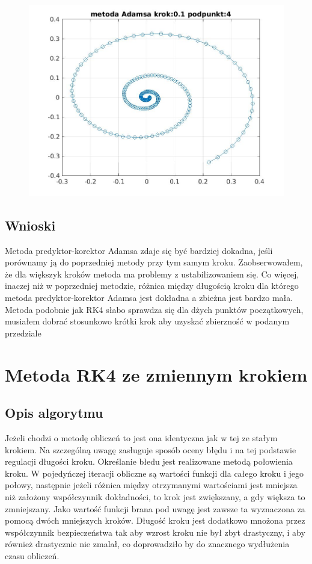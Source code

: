\documentclass[a4paper, 12pt]{article}
\begin{document}
\begin{figure}[H]
\centering
\includegraphics[width = 15cm]{2d/metoda Adamsa krok:0,1 podpunkt:4.jpg}
\end{figure}

\subsection{Wnioski}
Metoda predyktor-korektor Adamsa zdaje się być bardziej dokadna, jeśli porównamy ją do poprzedniej metody przy tym samym kroku. Zaobserwowałem, że dla większyk kroków metoda ma problemy z ustabilizowaniem się. Co więcej, inaczej niż w poprzedniej metodzie, różnica między długością kroku dla którego metoda predyktor-korektor Adamsa jest dokładna a zbieżna jest bardzo mała. Metoda podobnie jak RK4 słabo sprawdza się dla dżych punktów początkowych, musiałem dobrać stosunkowo krótki krok aby uzyskać zbierzność w podanym przedziale

\section{Metoda RK4 ze zmiennym krokiem}
\subsection{Opis algorytmu}
Jeżeli chodzi o metodę obliczeń to jest ona identyczna jak w tej ze stałym krokiem. Na szczególną uwagę zasługuje sposób oceny błędu i na tej podstawie regulacji długości kroku. Określanie błedu jest realizowane metodą połowienia kroku. W pojedyńczej iteracji obliczne są wartości funkcji dla całego kroku i jego połowy, następnie jeżeli różnica między otrzymanymi wartościami jest mniejsza niż założony współczynnik dokładności, to krok jest zwiększany, a gdy większa to zmniejszany. Jako wartość funkcji brana pod uwagę jest zawsze ta wyznaczona za pomocą dwóch mniejszych kroków. Długość kroku jest dodatkowo mnożona przez współczynnik bezpieczeństwa tak aby wzrost kroku nie był zbyt drastyczny, i aby również drastycznie nie zmalał, co doprowadziło by do znacznego wydłużenia czasu obliczeń. 
\end{document}
